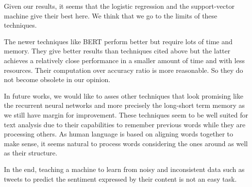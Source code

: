 \documentclass[11pt, a4paper, twocolumn]{article}
\begin{document}
Given our results, it seems that the logistic regression and the support-vector machine give their best here. We think that we go to the limits of these techniques. 

The newer techniques like BERT perform better but require lots of time and memory. They give better results than techniques cited above but the latter achieves a relatively close 
performance in a smaller amount of time and with less resources. Their computation over accuracy ratio is more reasonable. So they do not become obsolete in our opinion.

In future works, we would like to asses other techniques that look promising like the recurrent neural networks and more precisely the long-short term memory as we still have margin for improvement. These techniques seem to be well suited for text analysis due to their capabilities to remember previous words while they are processing others. As human 
language is based on aligning words together to make sense, it seems natural to process words considering the ones around as well as their structure. 

In the end, teaching a machine to learn from noisy and inconsistent data such as tweets to predict the sentiment expressed by their content is not an easy task.

\clearpage
\onecolumn
\end{document}
